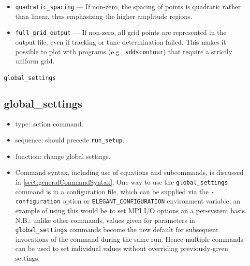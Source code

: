 \documentclass[11pt]{article}
\begin{document}
\begin{itemize}
from the first and second half of the tracking (the total number of turns is equal to the
value set in \verb|run_setup|).
The diffusion rate, 
\begin{equation}
  d_r = \log_{10} \left(\frac{\sqrt{\Delta\nu_x^2 + \Delta\nu_y^2}}{N}\right),
\end{equation} is also computed. $d_r$ is the more conventional quantity, computed by
programs such as TRACY and MAD \cite{BuesingPC}.
\item \verb|quadratic_spacing| --- If non-zero, the spacing of points is quadratic rather than linear, thus emphasizing
  the higher amplitude regions.
\item \verb|full_grid_output| --- If non-zero, all grid points are represented in the output file, even if tracking or
  tune determination failed. This makes it possible to plot with programs (e.g., \verb|sddscontour|) that require
  a strictly uniform grid.
\end{itemize}

\newpage
\begin{center}{\Large\verb|global_settings|}\end{center}
\subsection{global\_settings \label{subsec:globalsettings}}

\begin{itemize}
\item type: action command.  
\item sequence: should precede \verb|run_setup|.
\item function: change global settings.
\item Command syntax, including use of equations and subcommands, is discussed in \ref{sect:generalCommandSyntax}.
 One way to use the \verb|global_settings| command is in a configuration file, which can be supplied via the 
 \verb|-configuration| option or \verb|ELEGANT_CONFIGURATION| environment variable; an example of using this
 would be to set MPI I/O options an a per-system basis.
 N.B.: unlike other commands, values given for parameters in \verb|global_settings| commands become the
 new default for subsequent invocations of the command during the same run. Hence multiple commands can be used
 to set individual values without overriding previously-given settings.
\end{itemize}
\end{document}

